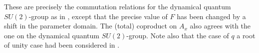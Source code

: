 \documentclass[10pt]{article}
\theoremstyle{definition}
\numberwithin{equation}{section}
\begin{document}
These are precisely the commutation relations for the dynamical quantum $SU(2)$-group as in \cite[Definition 2.6]{KoR1}, except that the precise value of $F$ has been changed by a shift in the parameter domain. The (total) coproduct on $A_x$ also agrees with the one on the dynamical quantum $SU(2)$-group. Note also that the case of $q$ a root of unity case had been considered in \cite{EtN1, Hay4}. 




%
%

\end{document}
